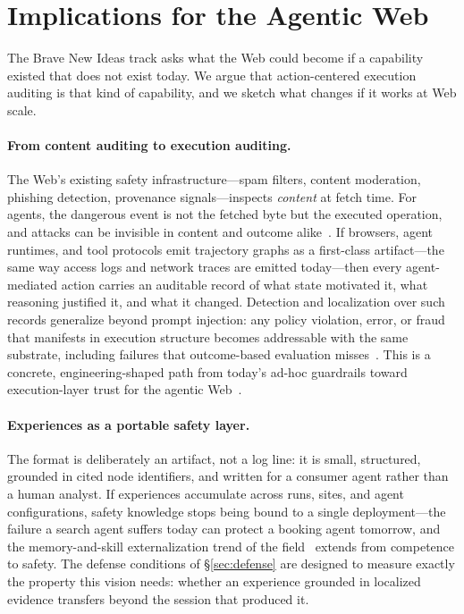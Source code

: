 \section{Implications for the Agentic Web}
\label{sec:vision}

The Brave New Ideas track asks what the Web could become if a capability existed that does not exist today. We argue that action-centered execution auditing is that kind of capability, and we sketch what changes if it works at Web scale.

\paragraph{From content auditing to execution auditing.}
The Web's existing safety infrastructure---spam filters, content moderation, phishing detection, provenance signals---inspects \emph{content} at fetch time. For agents, the dangerous event is not the fetched byte but the executed operation, and attacks can be invisible in content and outcome alike~\cite{lee2026will}. If browsers, agent runtimes, and tool protocols emit trajectory graphs as a first-class artifact---the same way access logs and network traces are emitted today---then every agent-mediated action carries an auditable record of what state motivated it, what reasoning justified it, and what it changed. Detection and localization over such records generalize beyond prompt injection: any policy violation, error, or fraud that manifests in execution structure becomes addressable with the same substrate, including failures that outcome-based evaluation misses~\cite{mohammadi2026trajectoryjudge,deng2026defa}. This is a concrete, engineering-shaped path from today's ad-hoc guardrails toward execution-layer trust for the agentic Web~\cite{yang2025agentic,ng2026agent}.

\paragraph{Experiences as a portable safety layer.}
The \sexp{} format is deliberately an artifact, not a log line: it is small, structured, grounded in cited node identifiers, and written for a consumer agent rather than a human analyst. If experiences accumulate across runs, sites, and agent configurations, safety knowledge stops being bound to a single deployment---the failure a search agent suffers today can protect a booking agent tomorrow, and the memory-and-skill externalization trend of the field~\cite{zhou2026externalization,zhao2023expel,allard2026experiential} extends from competence to safety. The defense conditions of \S\ref{sec:defense} are designed to measure exactly the property this vision needs: whether an experience grounded in localized evidence transfers beyond the session that produced it.

